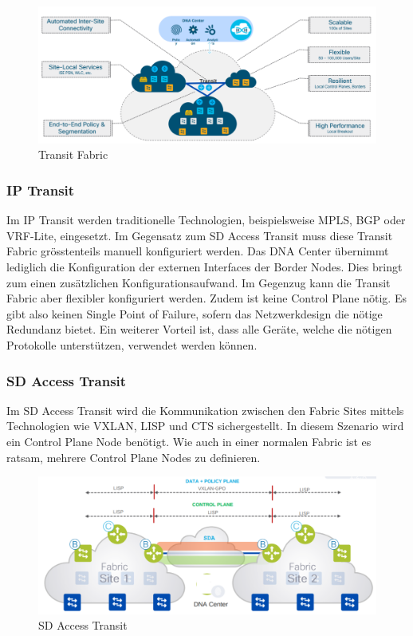 \begin{figure}[H]
	\centering
	\includegraphics[width=0.8\linewidth]{img/Absicherung/Transit-Fabric.png}
	\caption{Transit Fabric \cite{transit-fabric} }
	\label{fig:Transit Fabric}
\end{figure}

\subsubsection{IP Transit}

Im IP Transit werden traditionelle Technologien, beispielsweise MPLS, BGP oder VRF-Lite, eingesetzt. Im Gegensatz zum SD Access Transit muss diese Transit Fabric grösstenteils manuell konfiguriert werden. Das DNA Center übernimmt lediglich die Konfiguration der externen Interfaces der Border Nodes. 
Dies bringt zum einen zusätzlichen Konfigurationsaufwand. Im Gegenzug kann die Transit Fabric aber flexibler konfiguriert werden. Zudem ist keine Control Plane nötig. Es gibt also keinen Single Point of Failure, sofern das Netzwerkdesign die nötige Redundanz bietet.
Ein weiterer Vorteil ist, dass alle Geräte, welche die nötigen Protokolle unterstützen, verwendet werden können.

\subsubsection{SD Access Transit}

Im SD Access Transit wird die Kommunikation zwischen den Fabric Sites mittels Technologien wie VXLAN, LISP und CTS sichergestellt. In diesem Szenario wird ein Control Plane Node benötigt. Wie auch in einer normalen Fabric ist es ratsam, mehrere Control Plane Nodes zu definieren. 

\begin{figure}[H]
	\centering
	\includegraphics[width=0.8\linewidth]{img/Absicherung/SD-Access-Transit.png}
	\caption{SD Access Transit \cite{transit-fabric} }
	\label{fig:SD Access Transit}
\end{figure}

